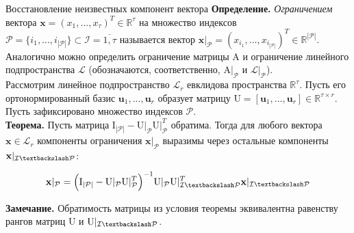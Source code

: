\begin{frame}{Восстановление неизвестных компонент вектора}
\textbf{Определение.} \textit{Ограничением} вектора $\mathbf{x} = (x_1, ..., x_\tau)^T \in \mathbb{R}^\tau$ на множество индексов $\mathcal{P} = \{ i_1, ..., i_{|\mathcal{P}|}\} \subset \mathcal{I} = \overline{1,\tau}$ называется вектор $\mathbf{x}\vert_{\mathcal{P}} = (x_{i_1}, ..., x_{i_{|\mathcal{P}|}})^T \in \mathbb{R}^{|\mathcal{P}|}$. Аналогично можно определить ограничение матрицы $\text{A}$ и ограничение линейного подпространства $\mathcal{L}$ (обозначаются, соответственно, $\text{A}\vert_{\mathcal{P}}$ и $\mathcal{L}\vert_{\mathcal{P}}$). \\

\vspace{0.3cm}
\newline
Рассмотрим линейное подпространство $\mathcal{L}_r$ евклидова пространства $\mathbb{R}^\tau$. Пусть его ортонормированный базис $\mathbf{u}_1, ..., \mathbf{u}_r$ образует матрицу $\text{U} = [\mathbf{u}_1, ..., \mathbf{u}_r] \in \mathbb{R}^{\tau \times r}$. Пусть зафиксировано множество индексов $\mathcal{P}$.\\
\textbf{Теорема.} Пусть матрица $\text{I}_{|\mathcal{P}|} - \text{U}\vert_{\mathcal{P}} \text{U}\vert_{\mathcal{P}}^T$ обратима. Тогда для любого вектора $\mathbf{x} \in \mathcal{L}_r$ компоненты ограничения $\mathbf{x}\vert_{\mathcal{P}}$ выразимы через остальные компоненты $\mathbf{x}\vert_{\mathcal{I} \textbackslash \mathcal{P}}$:

$$ \mathbf{x}\vert_{\mathcal{P}} = \Big( \text{I}_{|\mathcal{P}|} - \text{U}\vert_{\mathcal{P}} \text{U}\vert_{\mathcal{P}}^T \Big)^{-1} \text{U}\vert_{\mathcal{P}} \text{U}\vert_{\mathcal{I} \textbackslash \mathcal{P}}^T \mathbf{x}\vert_{\mathcal{I} \textbackslash \mathcal{P}}$$

\textbf{Замечание.} Обратимость матрицы из условия теоремы эквивалентна равенству рангов матриц $\text{U}$ и $\text{U}\vert_{\mathcal{I} \textbackslash \mathcal{P}}$.

\end{frame}

